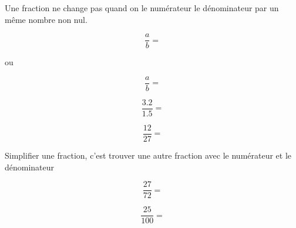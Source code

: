 \begin{myprop}
	Une fraction ne change pas quand on \hspace*{6cm} le numérateur  le dénominateur par un même nombre non nul.
	
	\begin{multicols}{3}
		\begin{equation*}
		\dfrac{a}{b} = %
		\end{equation*}
		
		 \begin{center}
		 	ou
		 \end{center}
		
		\begin{equation*}
		\dfrac{a}{b} = %
		\end{equation*}	
	\end{multicols}	
	
\end{myprop}

\begin{myexs}
	
	\begin{multicols}{2}
		
	\begin{equation*}
		\dfrac{\num{3.2}}{\num{1.5}} = %
	\end{equation*}
	
	
	\begin{equation*}
		\dfrac{\num{12}}{\num{27}} =  %
	\end{equation*}
	\end{multicols}
\end{myexs}

\begin{mydef}
	Simplifier une fraction, c'est trouver une autre fraction \hspace*{6cm} avec le numérateur et le dénominateur %
\end{mydef}

\begin{myexs}
	\begin{multicols}{2}
		\begin{equation*}
			\dfrac{\num{27}}{\num{72}} =  %
		\end{equation*}	
	
		\begin{equation*}
			\dfrac{\num{25}}{\num{100}} = %
		\end{equation*}	
	\end{multicols}
\end{myexs}
	